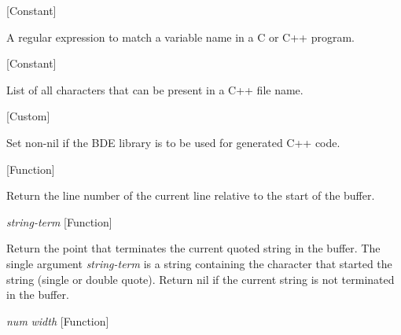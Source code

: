 \vspace{1em}
\noindent
{}
\usebox{\funcname}
 \hfill [Constant]

\begin{doc-string}
A regular expression to match a variable name in a C or C++ program.
\end{doc-string}

\vspace{1em}
\noindent
{}
\usebox{\funcname}
 \hfill [Constant]

\begin{doc-string}
List of all characters that can be present in a C++ file name.
\end{doc-string}

\vspace{1em}
\noindent
{}
\usebox{\funcname}
 \hfill [Custom]

\begin{doc-string}
Set non-nil if the BDE library is to be used for generated C++ code.
\end{doc-string}

\vspace{1em}
\noindent
{}
\usebox{\funcname}
 \hfill [Function]

\begin{doc-string}
Return the line number of the current line relative to the start of the buffer.
\end{doc-string}

\vspace{1em}
\noindent
{}
\usebox{\funcname}\emph{string-term}
 \hfill [Function]

\begin{doc-string}
Return the point that terminates the current quoted string in the buffer.
The single argument \emph{string-term} is a string containing the character that
started the string (single or double quote).  Return nil if the current
string is not terminated in the buffer.
\end{doc-string}

\vspace{1em}
\noindent
{}
\usebox{\funcname}\emph{num} \emph{width}
 \hfill [Function]


